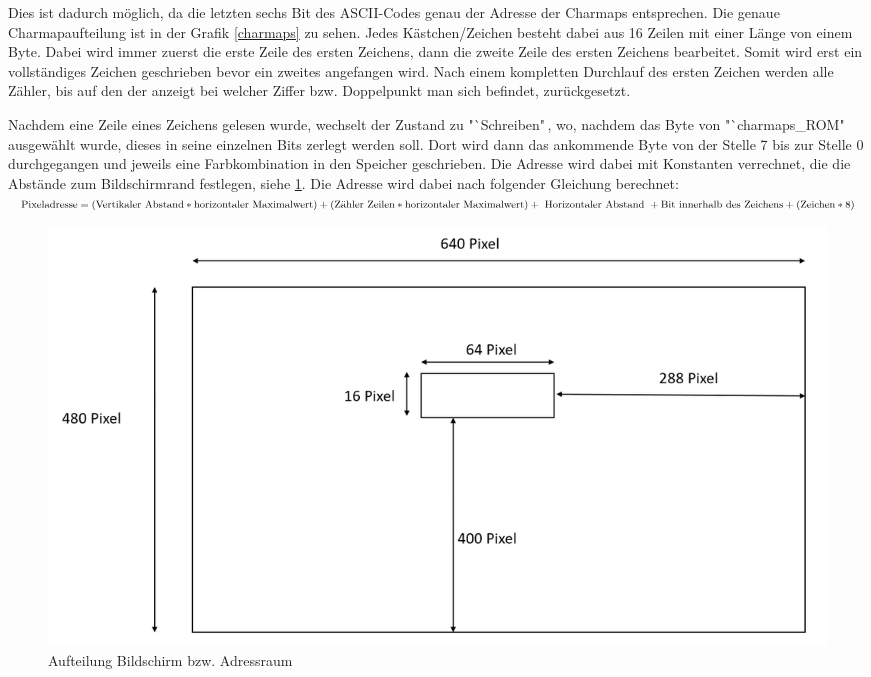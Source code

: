 \documentclass[12pt,a4paper,bibliography=totoc,listof=totoc]{scrartcl}
\begin{document}
Dies ist dadurch möglich, 
da die letzten sechs Bit des ASCII-Codes genau der Adresse der 
Charmaps entsprechen. Die genaue Charmapaufteilung ist in 
der Grafik \ref{charmaps} zu sehen. Jedes Kästchen/Zeichen besteht dabei aus 16 Zeilen mit einer Länge von einem Byte. Dabei wird immer zuerst 
die erste Zeile des ersten Zeichens, dann die zweite 
Zeile des ersten Zeichens bearbeitet. Somit wird erst ein vollständiges Zeichen geschrieben bevor ein zweites angefangen wird. Nach einem 
kompletten 
Durchlauf des ersten Zeichen werden alle Zähler, bis auf den der anzeigt bei welcher Ziffer bzw. Doppelpunkt man sich befindet, zurückgesetzt. 

 
Nachdem eine Zeile eines Zeichens gelesen wurde, wechselt der Zustand zu "`Schreiben"\,, wo, nachdem das Byte von "`charmaps\_ROM"\, ausgewählt 
wurde, dieses in seine einzelnen Bits zerlegt werden soll. 
Dort wird dann das ankommende Byte von der Stelle 7 bis zur Stelle 0 durchgegangen und jeweils eine 
Farbkombination in den Speicher geschrieben. Die Adresse wird dabei mit Konstanten verrechnet, die die Abstände zum Bildschirmrand festlegen, 
siehe 
\ref{bildschirm}. Die Adresse wird dabei nach folgender Gleichung berechnet: 
{\centering
\newline
$\text{Pixeladresse} =\newline (\text{Vertikaler Abstand} * 
\text{horizontaler Maximalwert}) +\newline (\text{Zähler Zeilen} * \text{horizontaler Maximalwert}) + \newline\text{ Horizontaler Abstand } + 
\text{Bit innerhalb des Zeichens} + (\text{Zeichen} * 8)$
\newline 
}
\begin{figure}[htbp]
	\centering
	\includegraphics[scale = 0.38]{pics/AufbauBildschirmspeicher}
	\caption{Aufteilung Bildschirm bzw. Adressraum}
	\label{bildschirm}
\end{figure} 
\end{document}
